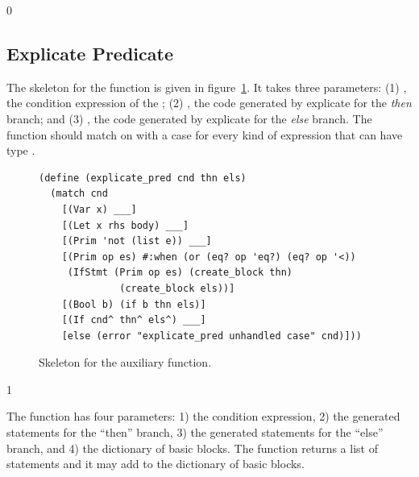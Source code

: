 \documentclass[7x10]{TimesAPriori_MIT}%
\def\racketEd{0}
\def\pythonEd{1}
\def\edition{1}
\newcommand{\pythonColor}[0]{}
\numberwithin{theorem}{chapter}
\numberwithin{definition}{chapter}
\numberwithin{equation}{chapter}
\begin{document}
{\if\edition\racketEd
  
\subsection{Explicate Predicate}

The skeleton for the  function is given in
figure~\ref{fig:explicate-pred}.  It takes three parameters: (1)
, the condition expression of the ; (2) ,
the code generated by explicate for the \emph{then} branch; and (3)
, the code generated by explicate for the \emph{else}
branch.  The  function should match on
 with a case for every kind of expression that can have type
\BOOLTY{}.

\begin{figure}[tbp]
  \begin{tcolorbox}[colback=white]
    \begin{lstlisting}
(define (explicate_pred cnd thn els)
  (match cnd
    [(Var x) ___]
    [(Let x rhs body) ___]
    [(Prim 'not (list e)) ___]
    [(Prim op es) #:when (or (eq? op 'eq?) (eq? op '<))
     (IfStmt (Prim op es) (create_block thn)
              (create_block els))]
    [(Bool b) (if b thn els)]
    [(If cnd^ thn^ els^) ___]
    [else (error "explicate_pred unhandled case" cnd)]))
\end{lstlisting}
  \end{tcolorbox}

  \caption{Skeleton for the  auxiliary function.}
\label{fig:explicate-pred}
\end{figure}

\fi}
%
{\if\edition\pythonEd\pythonColor

The  function has four parameters: 1) the
condition expression, 2) the generated statements for the ``then''
branch, 3) the generated statements for the ``else'' branch, and 4)
the dictionary of basic blocks. The  function
returns a list of \LangCIf{} statements and it may add to the
dictionary of basic blocks.

\fi}
\end{document}
